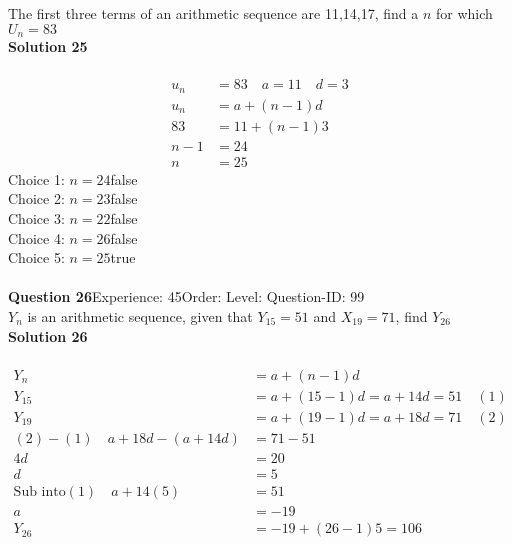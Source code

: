 \documentclass{article}
\begin{document}
The first three terms of an arithmetic sequence are 11,14,17, find a $n$ for which $U_n=83$\\[4pt]
\noindent\textbf{Solution 25}\\[2pt]
\\[-35pt]\begin{align*}
u_n&=83 \quad a=11 \quad d=3\\[2pt]
u_n&=a+(n-1)d\\[2pt]
83&=11+(n-1)3\\[2pt]
n-1&=24\\[2pt]
n&=25
\end{align*}
Choice 1: \hspace{20pt}$n=24$\hspace{20pt}false\\
Choice 2: \hspace{20pt}$n=23$\hspace{20pt}false\\
Choice 3: \hspace{20pt}$n=22$\hspace{20pt}false\\
Choice 4: \hspace{20pt}$n=26$\hspace{20pt}false\\
Choice 5: \hspace{20pt}$n=25$\hspace{20pt}true\\
\\[4pt]
\noindent\textbf{Question 26}\hspace{20pt}Experience: 45\hspace{20pt}Order: \hspace{20pt}Level: \hspace{20pt}Question-ID: 99\\[2pt]
$Y_n$ is an arithmetic sequence, given that $Y_{15}=51$ and $X_{19}=71$, find $Y_{26}$\\[4pt]
\noindent\textbf{Solution 26}\\[2pt]
\\[-35pt]\begin{align*}
Y_n&=a+(n-1)d\\[2pt]
Y_{15}&=a+(15-1)d=a+14d=51 \quad (1)\\[2pt]
Y_{19}&=a+(19-1)d=a+18d=71\quad (2) \\[2pt]
(2)-(1)\quad a+18d-(a+14d)&=71-51\\[2pt]
4d&=20\\[2pt]
d&=5\\[12pt]
\text{Sub into} (1) \quad a+14(5)&=51\\[2pt]
a&=-19\\[12pt]
Y_{26}&=-19+(26-1)5=106\\[-60pt]
\end{align*}
\end{document}
